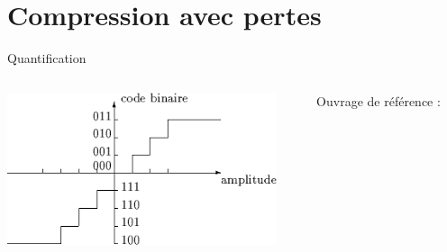 \documentclass[9pt, aspectratio=169]{beamer}
\begin{document}
\section{Compression avec pertes}
\begin{frame}{} %
\begin{center}
\Huge \insertsection
\end{center}
\end{frame}

\begin{frame}{Quantification} %
\begin{columns}
   \begin{column}{0.6\textwidth}
		\includegraphics[width=\textwidth]{fig/quantif.png}
   \end{column}
   \begin{column}{0.39\textwidth}
		Ouvrage de référence : \cite{moreau_tools_2011}
   \end{column}
\end{columns}
\end{frame}
\end{document}

